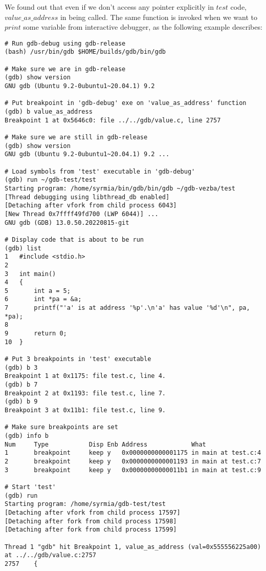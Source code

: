 \documentclass{report}
\begin{document}
 We found out that even if we don't access any pointer explicitly in $test$ code, $value\_as\_address$ in being called. The same function is invoked when we want to $print$ some variable from interactive debugger, as the following example describes:
\begin{verbatim}
# Run gdb-debug using gdb-release
(bash) /usr/bin/gdb $HOME/builds/gdb/bin/gdb

# Make sure we are in gdb-release     
(gdb) show version 
GNU gdb (Ubuntu 9.2-0ubuntu1~20.04.1) 9.2        

# Put breakpoint in 'gdb-debug' exe on 'value_as_address' function
(gdb) b value_as_address          
Breakpoint 1 at 0x5646c0: file ../../gdb/value.c, line 2757

# Make sure we are still in gdb-release
(gdb) show version  
GNU gdb (Ubuntu 9.2-0ubuntu1~20.04.1) 9.2 ...

# Load symbols from 'test' executable in 'gdb-debug'
(gdb) run ~/gdb-test/test               
Starting program: /home/syrmia/bin/gdb/bin/gdb ~/gdb-vezba/test
[Thread debugging using libthread_db enabled]
[Detaching after vfork from child process 6043]
[New Thread 0x7ffff49fd700 (LWP 6044)] ...
GNU gdb (GDB) 13.0.50.20220815-git

# Display code that is about to be run
(gdb) list                          
1	#include <stdio.h>
2	
3	int main()
4	{
5		int a = 5;
6		int *pa = &a;
7		printf("'a' is at address '%p'.\n'a' has value '%d'\n", pa, *pa);
8	
9		return 0;
10	}

# Put 3 breakpoints in 'test' executable
(gdb) b 3                                    
Breakpoint 1 at 0x1175: file test.c, line 4.
(gdb) b 7
Breakpoint 2 at 0x1193: file test.c, line 7.
(gdb) b 9
Breakpoint 3 at 0x11b1: file test.c, line 9.

# Make sure breakpoints are set
(gdb) info b                                
Num     Type           Disp Enb Address            What
1       breakpoint     keep y   0x0000000000001175 in main at test.c:4
2       breakpoint     keep y   0x0000000000001193 in main at test.c:7
3       breakpoint     keep y   0x00000000000011b1 in main at test.c:9

# Start 'test'
(gdb) run                                  
Starting program: /home/syrmia/gdb-test/test 
[Detaching after vfork from child process 17597]
[Detaching after fork from child process 17598]
[Detaching after fork from child process 17599]

Thread 1 "gdb" hit Breakpoint 1, value_as_address (val=0x555556225a00) at ../../gdb/value.c:2757
2757	{


\end{verbatim}
\end{document}
